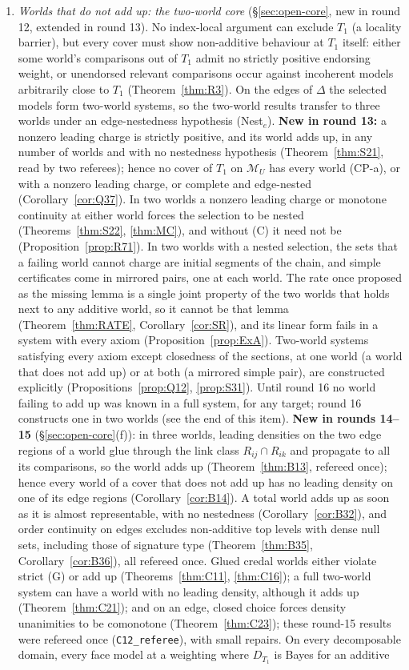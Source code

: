 \documentclass[11pt]{article}
\theoremstyle{definition}
\theoremstyle{remark}
\newcommand{\M}{\mathcal M}
\newcommand{\src}[1]{\texttt{#1}}
\begin{document}
\begin{enumerate}[leftmargin=*]
\item \emph{Worlds that do not add up: the two-world core} (\S\ref{sec:open-core}, new in round 12, extended in round 13). No index-local argument can exclude $T_1$ (a locality barrier), but every cover must show non-additive behaviour at $T_1$ itself: either some world's comparisons out of $T_1$ admit no strictly positive endorsing weight, or unendorsed relevant comparisons occur against incoherent models arbitrarily close to $T_1$ (Theorem~\ref{thm:R3}). On the edges of $\Delta$ the selected models form two-world systems, so the two-world results transfer to three worlds under an edge-nestedness hypothesis (Nest$_e$). \textbf{New in round 13:} a nonzero leading charge is strictly positive, and its world adds up, in any number of worlds and with no nestedness hypothesis (Theorem~\ref{thm:S21}, read by two referees); hence no cover of $T_1$ on $\M_U$ has every world (CP-a), or with a nonzero leading charge, or complete and edge-nested (Corollary~\ref{cor:Q37}). In two worlds a nonzero leading charge or monotone continuity at either world forces the selection to be nested (Theorems~\ref{thm:S22}, \ref{thm:MC}), and without (C) it need not be (Proposition~\ref{prop:R71}). In two worlds with a nested selection, the sets that a failing world cannot charge are initial segments of the chain, and simple certificates come in mirrored pairs, one at each world. The rate once proposed as the missing lemma is a single joint property of the two worlds that holds next to any additive world, so it cannot be that lemma (Theorem~\ref{thm:RATE}, Corollary~\ref{cor:SR}), and its linear form fails in a system with every axiom (Proposition~\ref{prop:ExA}). Two-world systems satisfying every axiom except closedness of the sections, at one world (a world that does not add up) or at both (a mirrored simple pair), are constructed explicitly (Propositions~\ref{prop:Q12}, \ref{prop:S31}). Until round 16 no world failing to add up was known in a full system, for any target; round 16 constructs one in two worlds (see the end of this item). \textbf{New in rounds 14--15} (\S\ref{sec:open-core}(f)): in three worlds, leading densities on the two edge regions of a world glue through the link class $R_{ij}\cap R_{ik}$ and propagate to all its comparisons, so the world adds up (Theorem~\ref{thm:B13}, refereed once); hence every world of a cover that does not add up has no leading density on one of its edge regions (Corollary~\ref{cor:B14}). A total world adds up as soon as it is almost representable, with no nestedness (Corollary~\ref{cor:B32}), and order continuity on edges excludes non-additive top levels with dense null sets, including those of signature type (Theorem~\ref{thm:B35}, Corollary~\ref{cor:B36}), all refereed once. Glued credal worlds either violate strict (G) or add up (Theorems~\ref{thm:C11}, \ref{thm:C16}); a full two-world system can have a world with no leading density, although it adds up (Theorem~\ref{thm:C21}); and on an edge, closed choice forces density unanimities to be comonotone (Theorem~\ref{thm:C23}); these round-15 results were refereed once (\src{C12\_referee}), with small repairs. On every decomposable domain, every face model at a weighting where $D_{T_1}$ is Bayes for an additive 
\end{enumerate}
\end{document}
